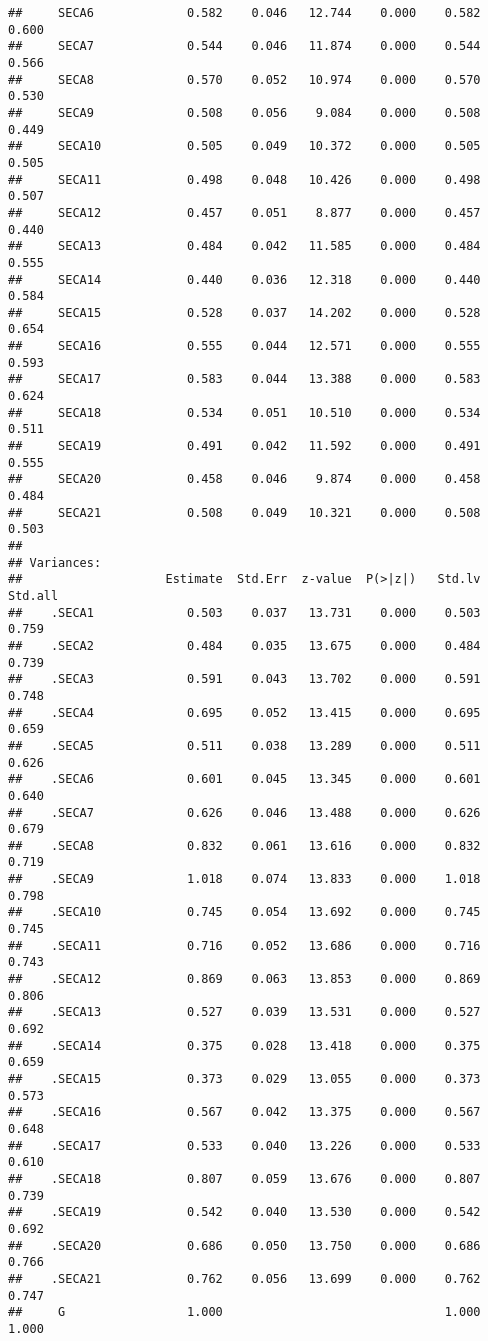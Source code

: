 \documentclass[
]{article}
\begin{document}
\begin{verbatim}
##     SECA6             0.582    0.046   12.744    0.000    0.582    0.600
##     SECA7             0.544    0.046   11.874    0.000    0.544    0.566
##     SECA8             0.570    0.052   10.974    0.000    0.570    0.530
##     SECA9             0.508    0.056    9.084    0.000    0.508    0.449
##     SECA10            0.505    0.049   10.372    0.000    0.505    0.505
##     SECA11            0.498    0.048   10.426    0.000    0.498    0.507
##     SECA12            0.457    0.051    8.877    0.000    0.457    0.440
##     SECA13            0.484    0.042   11.585    0.000    0.484    0.555
##     SECA14            0.440    0.036   12.318    0.000    0.440    0.584
##     SECA15            0.528    0.037   14.202    0.000    0.528    0.654
##     SECA16            0.555    0.044   12.571    0.000    0.555    0.593
##     SECA17            0.583    0.044   13.388    0.000    0.583    0.624
##     SECA18            0.534    0.051   10.510    0.000    0.534    0.511
##     SECA19            0.491    0.042   11.592    0.000    0.491    0.555
##     SECA20            0.458    0.046    9.874    0.000    0.458    0.484
##     SECA21            0.508    0.049   10.321    0.000    0.508    0.503
## 
## Variances:
##                    Estimate  Std.Err  z-value  P(>|z|)   Std.lv  Std.all
##    .SECA1             0.503    0.037   13.731    0.000    0.503    0.759
##    .SECA2             0.484    0.035   13.675    0.000    0.484    0.739
##    .SECA3             0.591    0.043   13.702    0.000    0.591    0.748
##    .SECA4             0.695    0.052   13.415    0.000    0.695    0.659
##    .SECA5             0.511    0.038   13.289    0.000    0.511    0.626
##    .SECA6             0.601    0.045   13.345    0.000    0.601    0.640
##    .SECA7             0.626    0.046   13.488    0.000    0.626    0.679
##    .SECA8             0.832    0.061   13.616    0.000    0.832    0.719
##    .SECA9             1.018    0.074   13.833    0.000    1.018    0.798
##    .SECA10            0.745    0.054   13.692    0.000    0.745    0.745
##    .SECA11            0.716    0.052   13.686    0.000    0.716    0.743
##    .SECA12            0.869    0.063   13.853    0.000    0.869    0.806
##    .SECA13            0.527    0.039   13.531    0.000    0.527    0.692
##    .SECA14            0.375    0.028   13.418    0.000    0.375    0.659
##    .SECA15            0.373    0.029   13.055    0.000    0.373    0.573
##    .SECA16            0.567    0.042   13.375    0.000    0.567    0.648
##    .SECA17            0.533    0.040   13.226    0.000    0.533    0.610
##    .SECA18            0.807    0.059   13.676    0.000    0.807    0.739
##    .SECA19            0.542    0.040   13.530    0.000    0.542    0.692
##    .SECA20            0.686    0.050   13.750    0.000    0.686    0.766
##    .SECA21            0.762    0.056   13.699    0.000    0.762    0.747
##     G                 1.000                               1.000    1.000
\end{verbatim}
\end{document}

